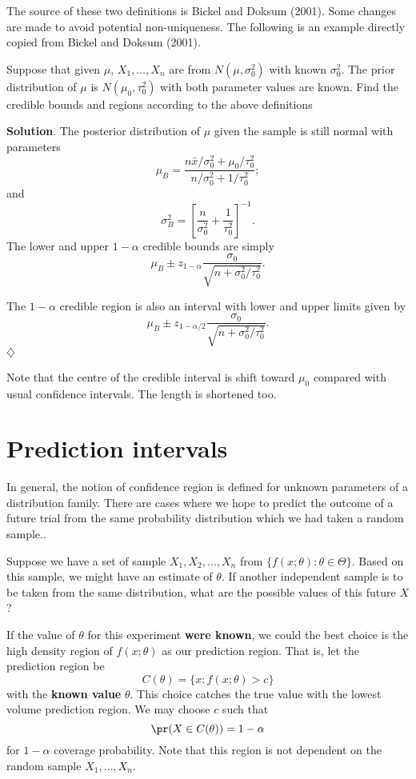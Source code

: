 The source of these two definitions is Bickel and Doksum (2001).
Some changes are made to avoid potential non-uniqueness. 
The following is an example directly copied from Bickel and Doksum (2001).

\begin{example}
Suppose that given $\mu$, $X_1, \ldots, X_n$ are \iid from $N(\mu, \sigma_0^2)$ with known
$\sigma_0^2$. The prior distribution of $\mu$ is $N(\mu_0, \tau_0^2)$ with both parameter
values are known. Find the credible bounds and regions according to the above definitions
\end{example}

\no
{\bf Solution}.
The posterior distribution of $\mu$ given the sample is still normal with
parameters
\[
\mu_B = \frac{ n \bar x/\sigma_0^2 + \mu_0 /\tau_0^2}{ n/\sigma_0^2 + 1 /\tau_0^2};
\]
and
\[
\sigma_B^2 = \left [ \frac{n}{\sigma_0^2} + \frac{1}{\tau_0^2} \right ]^{-1}.
\]
The lower and upper $1-\alpha$ credible bounds are simply
\[
\mu_B \pm z_{1-\alpha} \frac{\sigma_0}{\sqrt{n + \sigma_0^2/\tau_0^2}}.
\]

The $1-\alpha$ credible region is also an interval with
lower and upper limits given by
\[
\mu_B \pm z_{1-\alpha/2} \frac{\sigma_0}{\sqrt{n + \sigma_0^2/\tau_0^2}}.
\]
\hfill{$\diamondsuit$}

Note that the centre of the credible interval is shift toward $\mu_0$ compared
with usual confidence intervals. The length is shortened too.

\section{Prediction intervals}

In general, the notion of confidence region is defined for unknown parameters
of a distribution family. There are cases where we hope to predict the outcome
of a future trial from the same probability distribution which we had taken a random sample..

Suppose we have a set of \iid sample
$X_1, X_2, \ldots, X_n$  from $\{f(x; \theta): \theta \in \Theta\}$.
Based on this sample, we might have an estimate of $\theta$.
If another independent sample is to be taken
from the same distribution, what are the possible values of
this future $X$?

If the value of $\theta$ for this experiment {\bf were known}, we could
the best choice is the high density region of $f(x; \theta)$ as 
our prediction region.
That is, let the prediction region be
\[
C(\theta) = \{ x: f(x; \theta) > c \}
\]
with the {\bf known value} $\theta$.
This choice catches the true value with the lowest volume prediction region.
We may choose $c$ such that
\[
\pr( X \in C(\theta) ) = 1 - \alpha
\]
for $1-\alpha$ coverage probability.
Note that this region is not dependent on the random sample $X_1, \ldots, X_n$.


